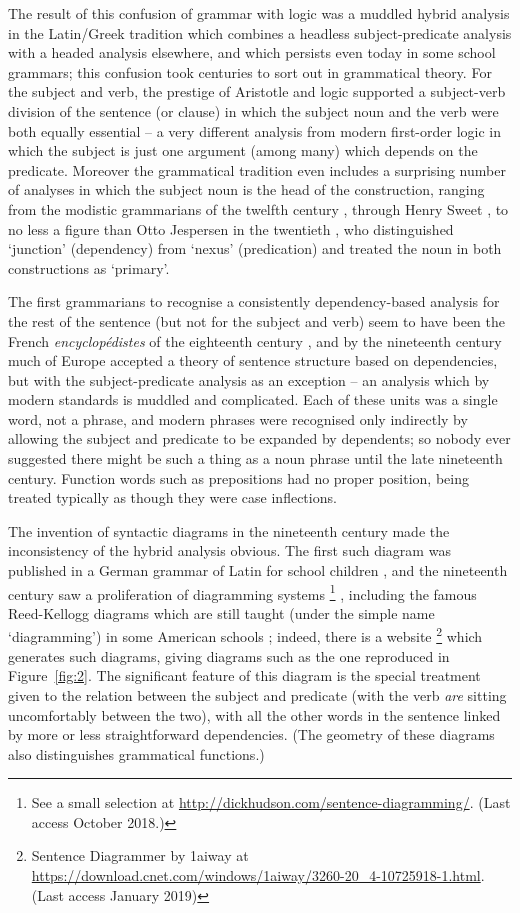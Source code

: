 \documentclass[output=paper]{langscibook}
\begin{document}
The result of this confusion of grammar with logic was a muddled hybrid analysis in the Latin/Greek tradition which combines a headless subject-predicate analysis with a headed analysis elsewhere, and which persists even today in some school grammars; this confusion took centuries to sort out in grammatical theory. For the subject and verb, the prestige of Aristotle and logic supported a subject-verb division of the sentence (or clause) in which the subject noun and the verb were both equally essential – a very different analysis from modern first-order logic in which the subject is just one argument (among many) which depends on the predicate. Moreover the grammatical tradition even includes a surprising number of analyses in which the subject noun is the head of the construction, ranging from the modistic grammarians of the twelfth century \citep[83]{Robins1967}, through Henry Sweet \citep[17]{Sweet1891}, to no less a figure than Otto Jespersen in the twentieth \citep{Jespersen37a-u}, who distinguished ‘junction’ (dependency) from ‘nexus’ (predication) and treated the noun in both constructions as ‘primary’.

The first grammarians to recognise a consistently dependency-based analysis for the rest of the sentence (but not for the subject and verb) seem to have been the French \emph{encyclopédistes} of the eighteenth century \citep{KahaneTBA}, and by the nineteenth century much of Europe accepted a theory of sentence structure based on dependencies, but with the subject-predicate analysis as an exception – an analysis which by modern standards is muddled and complicated. Each of these units was a single word, not a phrase, and modern phrases were recognised only indirectly by allowing the subject and predicate to be expanded by dependents; so nobody ever suggested there might be such a thing as a noun phrase until the late nineteenth century. Function words such as prepositions had no proper position, being treated typically as though they were case inflections.

The invention of syntactic diagrams in the nineteenth century made the inconsistency of the hybrid analysis obvious. The first such diagram was published in a German grammar of Latin for school children \citep{Billroth1832}, and the nineteenth century saw a proliferation of diagramming systems%
%
\footnote{See a small selection at \url{http://dickhudson.com/sentence-diagramming/}. (Last access October 2018.)}%
%
, including the famous Reed-Kellogg diagrams which are still taught (under the simple name ‘diagramming’) in some American schools \citep{ReedKellog1890}; indeed, there is a website%
%
\footnote{Sentence Diagrammer by 1aiway at \url{https://download.cnet.com/windows/1aiway/3260-20_4-10725918-1.html}. (Last access January 2019)}%
%
 which generates such diagrams, giving diagrams such as the one reproduced in Figure~\ref{fig:2}. The significant feature of this diagram is the special treatment given to the relation between the subject and predicate (with the verb \emph{are} sitting uncomfortably between the two), with all the other words in the sentence linked by more or less straightforward dependencies. (The geometry of these diagrams also distinguishes grammatical functions.)
 
\end{document}

